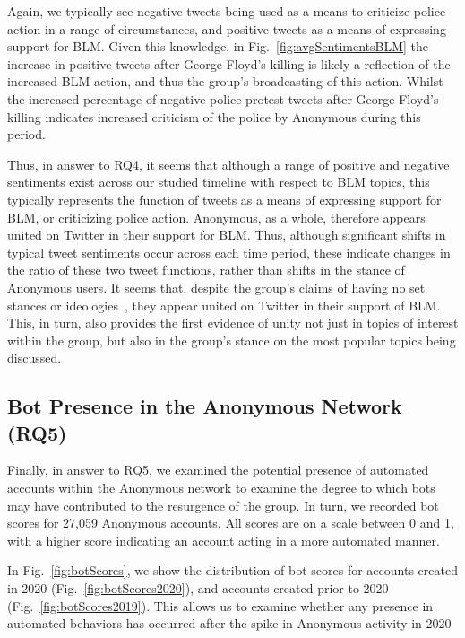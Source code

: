 \documentclass[letterpaper]{article}
\begin{document}
Again, we typically see negative tweets being used as a means to criticize police action in a range of circumstances, and positive tweets as a means of expressing support for BLM. Given this knowledge, in Fig.~\ref{fig:avgSentimentsBLM} the increase in positive tweets after George Floyd's killing is likely a reflection of the increased BLM action, and thus the group's broadcasting of this action. Whilst the increased percentage of negative police protest tweets after George Floyd's killing indicates increased criticism of the police by Anonymous during this period.

Thus, in answer to RQ4, it seems that although a range of positive and negative sentiments exist across our studied timeline with respect to BLM topics, this typically represents the function of tweets as a means of expressing support for BLM, or criticizing police action. Anonymous, as a whole, therefore appears united on Twitter in their support for BLM. Thus, although significant shifts in typical tweet sentiments occur across each time period, these indicate changes in the ratio of these two tweet functions, rather than shifts in the stance of Anonymous users. It seems that, despite the group's claims of having no set stances or ideologies~\cite{Olson2013}, they appear united on Twitter in their support of BLM. This, in turn, also provides the first evidence of unity not just in topics of interest within the group, but also in the group's stance on the most popular topics being discussed.

\subsection{Bot Presence in the Anonymous Network (RQ5)}

Finally, in answer to RQ5, we examined the potential presence of automated accounts within the Anonymous network to examine the degree to which bots may have contributed to the resurgence of the group. In turn, we recorded bot scores for 27,059 Anonymous accounts. All scores are on a scale between 0 and 1, with a higher score indicating an account acting in a more automated manner.

In Fig.~\ref{fig:botScores}, we show the distribution of bot scores for accounts created in 2020 (Fig.~\ref{fig:botScores2020}), and accounts created prior to 2020 (Fig.~\ref{fig:botScores2019}). This allows us to examine whether any presence in automated behaviors has occurred after the spike in Anonymous activity in 2020
\end{document}
